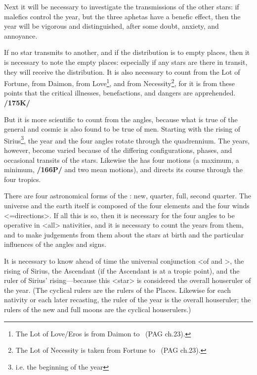 Next it will be necessary to investigate the transmissions of the other stars: if malefics control the year, but the three aphetas have a benefic effect, then the year will be vigorous and distinguished, after some doubt, anxiety, and annoyance.

If no star transmits to another, and if the distribution is to empty places, then it is necessary to note the empty places: especially if any stars are there in transit, they will receive the distribution. It is also necessary to count from the Lot of Fortune, from Daimon, from Love\footnote{The Lot of Love/Eros is from Daimon to \Venus\, (PAG ch.23).}, and from
Necessity\footnote{The Lot of Necessity is taken from Fortune to \Mercury\, (PAG ch.23).}, for it is from these points that the critical illnesses, benefactions, and dangers are apprehended. \textbf{/175K/}

But it is more scientific to count from the angles, because what is true of the general and cosmic is also found to be true of men. Starting with the rising of Sirius\footnote{i.e. the beginning of the year}, the year and the four angles rotate through the quadrennium. The years, however, become varied because of the differing configurations, phases, and occasional transits of the stars. Likewise the \Sun\xspace has four motions (a maximum, a minimum, \textbf{/166P/} and two mean motions), and directs its course through the four tropics. 

There are four astronomical forms of the \Moon: new, quarter, full, second quarter. The universe and the earth itself is composed of the four elements and the four winds <=directions>. If all this is so, then it is necessary for the four angles to be operative in <all> nativities, and it is necessary to count the years from them, and to make judgements from them about the stars at birth and the particular influences of the angles and signs. 

It is necessary to know ahead of time the universal conjunction <of \Sun\xspace and \Moon>, the rising of Sirius, the Ascendant (if the Ascendant is at a tropic point), and the ruler of Sirius’ rising—because this <star> is considered the overall houseruler of the year. (The cyclical rulers are the rulers of the Places. Likewise for each nativity or each later recasting, the ruler of the year is the overall houseruler; the rulers of the new and full moons are
the cyclical houserulers.)

